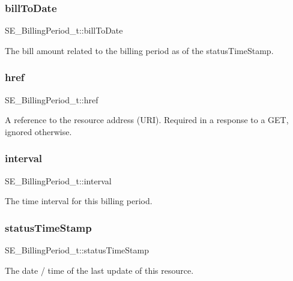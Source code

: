 \subsubsection{\texorpdfstring{bill\+To\+Date}{billToDate}}
{\footnotesize\ttfamily S\+E\+\_\+\+Billing\+Period\+\_\+t\+::bill\+To\+Date}

The bill amount related to the billing period as of the status\+Time\+Stamp. \mbox{\label{group__BillingPeriod_ga561582b7871962d2bc055f2aca5b524a}} 
\subsubsection{\texorpdfstring{href}{href}}
{\footnotesize\ttfamily S\+E\+\_\+\+Billing\+Period\+\_\+t\+::href}

A reference to the resource address (U\+RI). Required in a response to a G\+ET, ignored otherwise. \mbox{\label{group__BillingPeriod_gaa9c176ad1af5f803fdbaa6aa0e7c7f4c}} 
\subsubsection{\texorpdfstring{interval}{interval}}
{\footnotesize\ttfamily S\+E\+\_\+\+Billing\+Period\+\_\+t\+::interval}

The time interval for this billing period. \mbox{\label{group__BillingPeriod_ga30652052a4a01d69723c9faf9dd24b29}} 
\subsubsection{\texorpdfstring{status\+Time\+Stamp}{statusTimeStamp}}
{\footnotesize\ttfamily S\+E\+\_\+\+Billing\+Period\+\_\+t\+::status\+Time\+Stamp}

The date / time of the last update of this resource. 